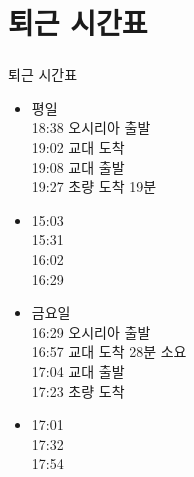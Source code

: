 \documentclass[aspectratio=1610,20pt,xcolor=pdftex,dvipsnames,table,handout]{beamer}
\begin{document}
		\section{퇴근 시간표}
		\begin{frame} [t,plain]
		\frametitle{}
			\begin{block} {퇴근 시간표}
			\setlength{\leftmargini}{2em}			
			\begin{itemize}
				\item  	평일\\
						18:38	 오시리아 출발 \\
						19:02	 교대 도착  \\
						19:08	 교대 출발  \\
						19:27	 초량 도착 19분  \\
				\item 	15:03 \\
						15:31 \\
						16:02 \\
						16:29 \\

				\item  	금요일\\
						16:29	 오시리아 출발 \\
						16:57	 교대 도착  28분 소요 \\
						17:04	 교대 출발  \\
						17:23	 초량 도착  \\
				\item 	17:01 \\
						17:32 \\
						17:54 \\

			\end{itemize}
			\end{block}				


		\end{frame}						

\end{document}
